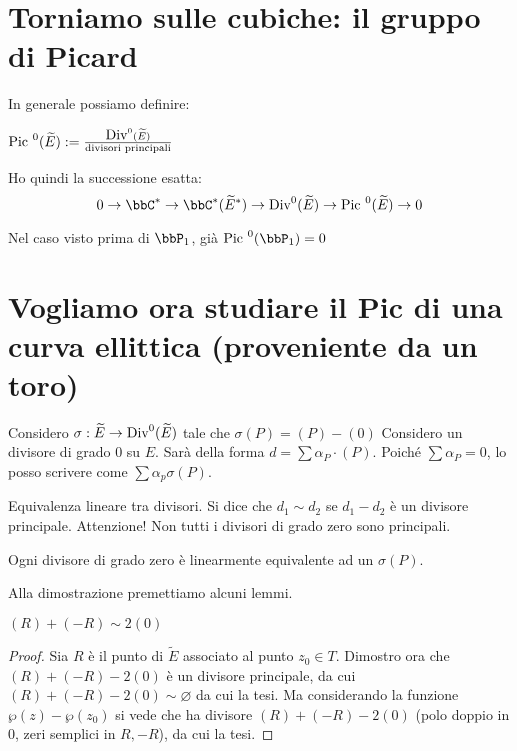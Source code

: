 \section{Torniamo sulle cubiche: il gruppo di Picard}
In generale possiamo definire:

\begin{definizione}
$\mbox{Pic }^0(\widetilde{E}) := \frac{\mbox{Div}^0(\widetilde{E})}{\text{divisori principali}}$
\end{definizione}

\begin{osservazione}
Ho quindi la successione esatta:
$$0 \rightarrow \bbC^* \rightarrow \bbC^*(\widetilde{E}^*) \rightarrow \Div^0(\widetilde{E})\rightarrow \Pic^0(\widetilde{E})\rightarrow 0$$
\end{osservazione}

Nel caso visto prima di $\bbP_1$, già $\Pic^0(\bbP_1)=0$


\section{Vogliamo ora studiare il Pic di una curva ellittica (proveniente da un toro)}

Considero $\sigma : \widetilde E \rightarrow \mbox{Div}^0(\widetilde E)$ tale che $\sigma(P)=(P)-(0)$
Considero un divisore di grado $0$ su $E$. Sarà della forma $d = \sum\alpha_P\cdot(P)$.
Poiché $\sum \alpha_P=0$, lo posso scrivere come $\sum\alpha_p \sigma(P)$.

\begin{definizione}
Equivalenza lineare tra divisori. Si dice che $d_1 \sim d_2$ se $d_1-d_2$ è un divisore principale. Attenzione! Non tutti i divisori di grado zero sono principali.
\end{definizione}

\begin{teorema}
Ogni divisore di grado zero è linearmente equivalente ad un $\sigma(P)$.
\end{teorema}

Alla dimostrazione premettiamo alcuni lemmi. 
\begin{lemma}
  \label{lemma_equiv_lin}
$(R) + (-R) \sim 2(0)$
\end{lemma}
\begin{proof}
Sia $R$ è il punto di $\widetilde E$ associato al punto $z_0 \in T$.
Dimostro ora che $(R)+(-R)-2(0)$ è un divisore principale, da cui $(R)+(-R)-2(0) \sim \varnothing$ da cui la tesi.
Ma considerando la funzione $\wp(z)-\wp(z_0)$ si vede che ha divisore $(R)+(-R)-2(0)$ (polo doppio in $0$, zeri semplici in $R,-R$), da cui la tesi.
\end{proof}

